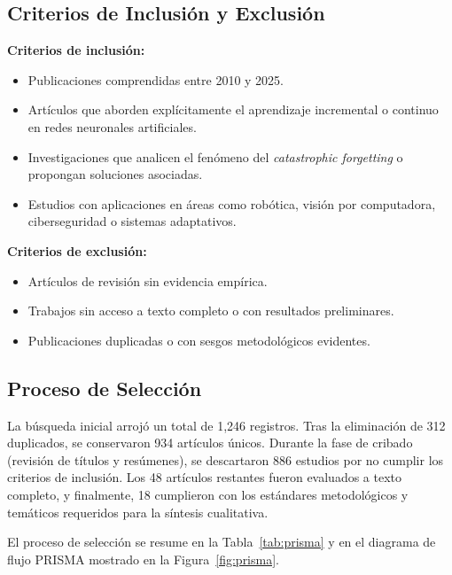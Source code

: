 \documentclass[10pt,a4paper]{article}
\begin{document}
\subsection{Criterios de Inclusión y Exclusión}
\textbf{Criterios de inclusión:}
\begin{itemize}
    \item Publicaciones comprendidas entre 2010 y 2025.
    \item Artículos que aborden explícitamente el aprendizaje incremental o continuo en redes neuronales artificiales.
    \item Investigaciones que analicen el fenómeno del \textit{catastrophic forgetting} o propongan soluciones asociadas.
    \item Estudios con aplicaciones en áreas como robótica, visión por computadora, ciberseguridad o sistemas adaptativos.
\end{itemize}

\textbf{Criterios de exclusión:}
\begin{itemize}
    \item Artículos de revisión sin evidencia empírica.
    \item Trabajos sin acceso a texto completo o con resultados preliminares.
    \item Publicaciones duplicadas o con sesgos metodológicos evidentes.
\end{itemize}

\subsection{Proceso de Selección}
La búsqueda inicial arrojó un total de 1,246 registros. Tras la eliminación de 312 duplicados, se conservaron 934 artículos únicos.  
Durante la fase de cribado (revisión de títulos y resúmenes), se descartaron 886 estudios por no cumplir los criterios de inclusión.  
Los 48 artículos restantes fueron evaluados a texto completo, y finalmente, 18 cumplieron con los estándares metodológicos y temáticos requeridos para la síntesis cualitativa.  

El proceso de selección se resume en la Tabla~\ref{tab:prisma} y en el diagrama de flujo PRISMA mostrado en la Figura~\ref{fig:prisma}.
\end{document}
